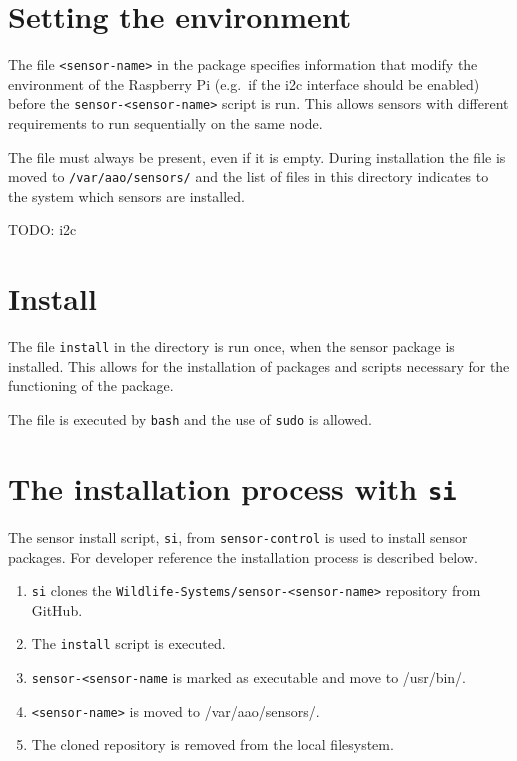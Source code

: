 \documentclass[
]{book}
\begin{document}
\hypertarget{setting-the-environment}{%
\section{Setting the environment}\label{setting-the-environment}}

The file \texttt{\textless{}sensor-name\textgreater{}} in the package specifies information that modify the environment of the Raspberry Pi (e.g.~if the i2c interface should be enabled) before the \texttt{sensor-\textless{}sensor-name\textgreater{}} script is run. This allows sensors with different requirements to run sequentially on the same node.

The file must always be present, even if it is empty. During installation the file is moved to \texttt{/var/aao/sensors/} and the list of files in this directory indicates to the system which sensors are installed.

TODO: i2c

\hypertarget{install}{%
\section{Install}\label{install}}

The file \texttt{install} in the directory is run once, when the sensor package is installed. This allows for the installation of packages and scripts necessary for the functioning of the package.

The file is executed by \texttt{bash} and the use of \texttt{sudo} is allowed.

\hypertarget{the-installation-process-with-si}{%
\section{\texorpdfstring{The installation process with \texttt{si}}{The installation process with si}}\label{the-installation-process-with-si}}

The sensor install script, \texttt{si}, from \texttt{sensor-control} is used to install sensor packages. For developer reference the installation process is described below.

\begin{enumerate}
\def\labelenumi{\arabic{enumi}.}
\item
  \texttt{si} clones the \texttt{Wildlife-Systems/sensor-\textless{}sensor-name\textgreater{}} repository from GitHub.
\item
  The \texttt{install} script is executed.
\item
  \texttt{sensor-\textless{}sensor-name} is marked as executable and move to /usr/bin/.
\item
  \texttt{\textless{}sensor-name\textgreater{}} is moved to /var/aao/sensors/.
\item
  The cloned repository is removed from the local filesystem.
\end{enumerate}
\end{document}
